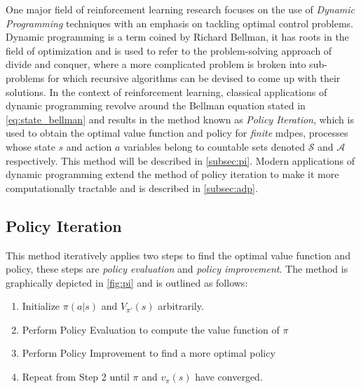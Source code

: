\documentclass[../report.tex]{subfiles}
\begin{document}
One major field of reinforcement learning research focuses on the use of \textit{Dynamic Programming} techniques with an emphasis on tackling optimal control problems\cite{rl_and_dp}. Dynamic programming is a term coined by Richard Bellman, it has roots in the field of optimization and is used to refer to the problem-solving approach of divide and conquer, where a more complicated problem is broken into sub-problems for which recursive algorithms can be devised to come up with their solutions\cite{dp}. In the context of reinforcement learning, classical applications of dynamic programming revolve around the Bellman equation stated in \autoref{eq:state_bellman} and results in the method known as \textit{Policy Iteration}, which is used to obtain the optimal value function and policy for \textit{finite} \ac{mdp}es, processes whose state $s$ and action $a$ variables belong to countable sets denoted $\mathcal{S}$ and $\mathcal{A}$ respectively. This method will be described in \autoref{subsec:pi}. Modern applications of dynamic programming extend the method of policy iteration to make it more computationally tractable and is described in \autoref{subsec:adp}.

\subsection{Policy Iteration}\label{subsec:pi}

This method iteratively applies two steps to find the optimal value function and policy, these steps are \textit{policy evaluation} and \textit{policy improvement}. The method is graphically depicted in \autoref{fig:pi} and is outlined as follows:

\begin{enumerate}
    \item Initialize $\pi(a|s)$ and $V_{\pi'}(s)$ arbitrarily.
    \item Perform Policy Evaluation to compute the value function of $\pi$
    \item Perform Policy Improvement to find a more optimal policy 
    \item Repeat from Step 2 until $\pi$ and $v_{\pi}(s)$ have converged.
\end{enumerate}
\end{document}
